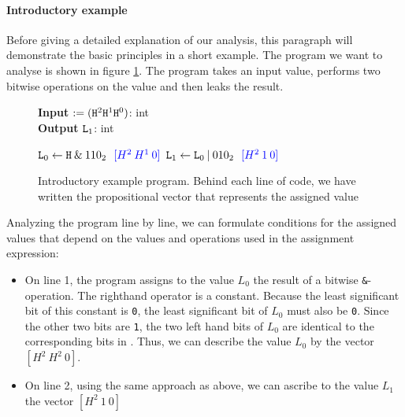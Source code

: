 \paragraph{Introductory example}\label{p:intro}
Before giving a detailed explanation of our analysis, this paragraph will demonstrate the basic principles in a short example. The program we want to analyse is shown in figure \ref{fig:introEx}. The program takes an input value, performs two bitwise operations on the value and then leaks the result. 

\begin{figure}
    \centering
    \begin{minipage}{.7\linewidth}
        \begin{algorithm}[H]
            \hspace*{\algorithmicindent} \textbf{Input} \In $:= (\mathtt{H}^2 \mathtt{H}^1 \mathtt{H}^0)$: int \\
            \hspace*{\algorithmicindent} \textbf{Output} $\mathtt{L}_1$: int
            \hspace*{1em}
            \begin{algorithmic}[1]
                \State $\mathtt{L}_0 \leftarrow \mathtt{H} \: \& \: 110_2 \: \: \: \textcolor{blue}{[H^2 \: H^1 \:0]}$
                \State $\mathtt{L}_1 \leftarrow \mathtt{L}_0 \: | \: 010_2 \: \: \: \textcolor{blue}{[H^2 \: 1 \: 0]}$
            \end{algorithmic} 
        \end{algorithm}
\end{minipage}
\caption{Introductory example program. Behind each line of code, we have written the propositional vector that represents the assigned value}
\label{fig:introEx}
\end{figure}

Analyzing the program line by line, we can formulate conditions for the assigned values that depend on the values and operations used in the assignment expression:
\begin{itemize}
    \item On line 1, the program assigns to the value $L_0$ the result of a bitwise \texttt{\&}-operation. The righthand operator is a constant. Because the least significant bit of this constant is \texttt{0}, the least significant bit of $L_0$ must also be \texttt{0}. Since the other two bits are \texttt{1}, the two left hand bits of $L_0$ are identical to the corresponding bits in \In. Thus, we can describe the value $L_0$ by the vector $[H^2 \: H^2 \: 0]$.
    \item On line 2, using the same approach as above, we can ascribe to the value $L_1$ the vector $[H^2 \: 1 \: 0]$
\end{itemize}


